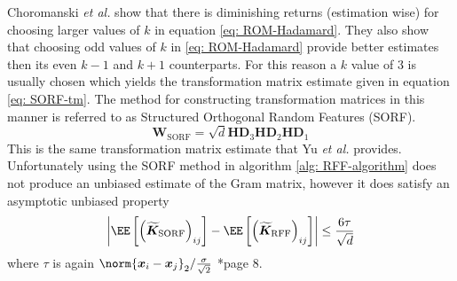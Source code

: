 Choromanski {\it et al.} \cite{ChoromanskiKrzysztof2017TUEo} show that there is diminishing returns (estimation wise) for choosing larger values of $k$ in equation \ref{eq: ROM-Hadamard}. They also show that choosing odd values of $k$ in \ref{eq: ROM-Hadamard} provide better estimates then its even $k-1$ and $k+1$ counterparts. For this reason a $k$ value of $3$ is usually chosen which yields the transformation matrix estimate given in equation \ref{eq: SORF-tm}. The method for constructing transformation matrices in this manner is referred to as Structured Orthogonal Random Features (SORF).
\begin{equation} \label{eq: SORF-tm}
    \bm{W}_{\text{SORF}} = \sqrt{d} \bm{H} \bm{D}_{3} \bm{H} \bm{D}_{2} \bm{H} \bm{D}_{1}
\end{equation}
This is the same transformation matrix estimate that Yu {\it et al.} provides. Unfortunately using the SORF method in algorithm \ref{alg: RFF-algorithm} does not produce an unbiased estimate of the Gram matrix, however it does satisfy an asymptotic unbiased property
\begin{equation*}
    \left| \EE \left[ \left( \bm{\widetilde{K}}_{\text{SORF}} \right)_{ij} \right] - \EE \left[ \left( \bm{\widetilde{K}}_{\text{RFF}} \right)_{ij} \right] \right| \leq \frac{6 \tau}{\sqrt{d}}
\end{equation*}
where $\tau$ is again $\norm{\bm{x}_i - \bm{x}_j}_2 / \frac{\sigma}{\sqrt{2}}$ \cite{LiuFanghui2021RFfK}*{page 8}.

